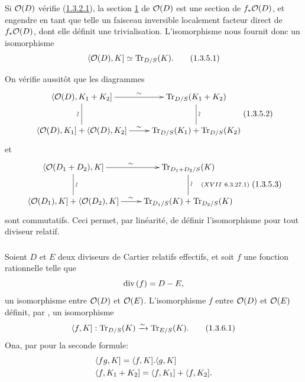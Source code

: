 \documentclass[10pt]{../fichiers-configuration-latex/smfart}
\begin{document}
Si ${\mathcal O}(D)$ vérifie (\hyperref[XVIII.par1.3.2.1]{1.3.2.1}), la section
\hyperref[XVIII.sec1]{1} de ${\mathcal O}(D)$ est une 
section de $f_{\ast}{\mathcal O}(D)$, et engendre en tant que telle un
faisceau inversible localement facteur direct de $f_{\ast}{\mathcal O}(D)$,
dont elle définit une trivialisation. L'isomorphisme  nous
fournit donc un isomorphisme 
\begin{equation*}
\langle {\mathcal O}(D),K]\simeq \operatorname{Tr}_{D/S}(K){}.\tag{1.3.5.1}
\end{equation*}

On vérifie aussitôt que les diagrammes
$$\vcenter{
\xymatrix{
  \langle \Oo(D) , K_1 + K_2] \ar[r]^{\sim} \ar@{-}[d]_{\text{\rotatebox{90}{$\sim$}}}& \Tr_{D/S}(K_1 + K_2)\ar@{-}[d]^{\text{\rotatebox{90}{$\sim$}}}\\
\langle \Oo(D),K_1] + \langle \Oo(D) ,K_2] \ar[r]^{\sim}& \Tr_{D/S}(K_1) + \Tr_{D/S}(K_2)
}}\leqno{(1.3.5.2)}
$$%
et
$$\vcenter{
\xymatrix{
\langle \Oo(D_1 + D_2),K] \ar[r]^{\sim}
\ar@{-}[d]^{\text{\rotatebox{90}{$\sim$}}}& \Tr_{D_1 +
  D_{2}/S}(K)\ar@{-}[d]^{\text{\rotatebox{90}{$\sim$}}\quad (XVII\
  6.3.27.1)}\\ 
\langle \Oo(D_1),K] + \langle \Oo(D_2),K] \ar[r]^{\sim}& \Tr_{D_1 /S}(K) +
    \Tr_{D_{2} /S} (K)
}}\leqno{(1.3.5.3)}
$$%
sont commutatifs. Ceci permet, par linéarité, de définir
l'isomorphisme  pour tout diviseur relatif.

\subsubsection{}
Soient $D$ et $E$ deux diviseurs de Cartier relatifs effectifs, et soit
$f$ une fonction rationnelle telle que
$$
\text{\rm div\,}(f)=D-E{},
$$
\ie un isomorphisme entre ${\mathcal O}(D)$ et ${\mathcal O}(E)$. L'isomorphisme $f$
entre ${\mathcal O}(D)$ et ${\mathcal O}(E)$ définit, par , un isomorphisme
\begin{equation*}
\langle f,K]:\operatorname{Tr}_{D/S}(K)\xrightarrow{\sim} \operatorname{Tr}_{E/S}(K){}.\tag{1.3.6.1}
\end{equation*}\etiquette[1.3.6.1]{XVIII.eq1.3.6.1}%
On\pageoriginale a, par  pour la seconde formule: 
\begin{align*}
& \langle fg,K]=\langle f,K].\langle g,K]\\
& \langle f,K_{1}+K_{2}]=\langle f,K_{1}]+\langle f,K_{2}]{}.
\end{align*}
\end{document}
